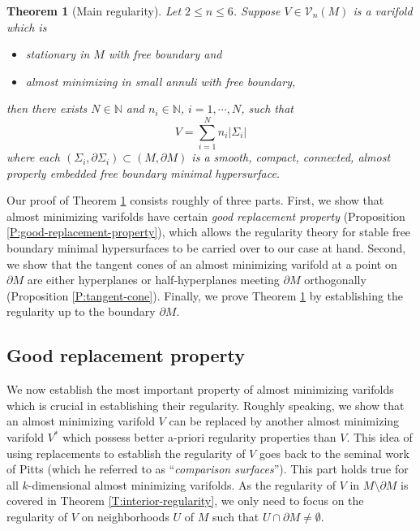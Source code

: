 \documentclass[10pt]{amsart}
\newtheorem{theorem}{Theorem}[section]
\theoremstyle{definition}
\theoremstyle{remark}
\numberwithin{equation}{section}
\newcommand{\V}{\mathcal{V}}
\newcommand{\N}{\mathbb{N}}
\begin{document}
\begin{theorem}[Main regularity]
\label{T:main-regularity}
Let $2 \leq n \leq 6$. Suppose $V \in \V_n(M)$ is a varifold which is 
\begin{itemize}
\item stationary in $M$ with free boundary and 
\item almost minimizing in small annuli with free boundary,
\end{itemize}
then there exists $N \in \N$ and $n_i \in \N$, $i=1,\cdots,N$, such that
\[ V= \sum_{i=1}^N n_i |\Sigma_i| \]
where each $(\Sigma_i,\partial \Sigma_i) \subset (M,\partial M)$ is a smooth, compact, connected, almost properly embedded free boundary minimal hypersurface.
\end{theorem}

Our proof of Theorem \ref{T:main-regularity} consists roughly of three parts. First, we show that almost minimizing varifolds have certain \emph{good replacement property} (Proposition \ref{P:good-replacement-property}), which allows the regularity theory for stable free boundary minimal hypersurfaces to be carried over to our case at hand. Second, we show that the tangent cones of an almost minimizing varifold at a point on $\partial M$ are either hyperplanes or half-hyperplanes meeting $\partial M$ orthogonally (Proposition \ref{P:tangent-cone}). Finally, we prove Theorem \ref{T:main-regularity} by establishing the regularity up to the boundary $\partial M$. 



\subsection{Good replacement property}
\label{SS:replacement}


We now establish the most important property of almost minimizing varifolds which is crucial in establishing their regularity. Roughly speaking, we show that an almost minimizing varifold $V$ can be replaced by another almost minimizing varifold $V^*$ which possess better a-priori regularity properties than $V$. This idea of using replacements to establish the regularity of $V$ goes back to the seminal work of Pitts \cite[Theorem 3.11]{Pitts} (which he referred to as ``\emph{comparison surfaces}''). This part holds true for all $k$-dimensional almost minimizing varifolds. As the regularity of $V$ in $M \setminus \partial M$ is covered in Theorem \ref{T:interior-regularity}, we only need to focus on the regularity of $V$ on neighborhoods $U$ of $M$ such that $U \cap \partial M \neq \emptyset$. 
\end{document}
